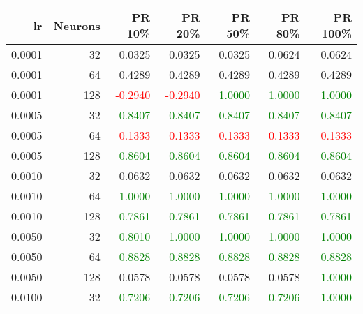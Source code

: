 \begin{tabular}{rrrrrrr}
\toprule
lr & Neurons & PR 10\% & PR 20\% & PR 50\% & PR 80\% & PR 100\% \\
\midrule
0.0001 & 32 & \textcolor{blu} {0.0325} & \textcolor{blu} {0.0325} & \textcolor{blu} {0.0325} & \textcolor{blu} {0.0624} & \textcolor{blu} {0.0624} \\
0.0001 & 64 & \textcolor{blu} {0.4289} & \textcolor{blu} {0.4289} & \textcolor{blu} {0.4289} & \textcolor{blu} {0.4289} & \textcolor{blu} {0.4289} \\
0.0001 & 128 & \textcolor{red} {-0.2940} & \textcolor{red} {-0.2940} & \textcolor{green} {1.0000} & \textcolor{green} {1.0000} & \textcolor{green} {1.0000} \\
0.0005 & 32 & \textcolor{green} {0.8407} & \textcolor{green} {0.8407} & \textcolor{green} {0.8407} & \textcolor{green} {0.8407} & \textcolor{green} {0.8407} \\
0.0005 & 64 & \textcolor{red} {-0.1333} & \textcolor{red} {-0.1333} & \textcolor{red} {-0.1333} & \textcolor{red} {-0.1333} & \textcolor{red} {-0.1333} \\
0.0005 & 128 & \textcolor{green} {0.8604} & \textcolor{green} {0.8604} & \textcolor{green} {0.8604} & \textcolor{green} {0.8604} & \textcolor{green} {0.8604} \\
0.0010 & 32 & \textcolor{blu} {0.0632} & \textcolor{blu} {0.0632} & \textcolor{blu} {0.0632} & \textcolor{blu} {0.0632} & \textcolor{blu} {0.0632} \\
0.0010 & 64 & \textcolor{green} {1.0000} & \textcolor{green} {1.0000} & \textcolor{green} {1.0000} & \textcolor{green} {1.0000} & \textcolor{green} {1.0000} \\
0.0010 & 128 & \textcolor{green} {0.7861} & \textcolor{green} {0.7861} & \textcolor{green} {0.7861} & \textcolor{green} {0.7861} & \textcolor{green} {0.7861} \\
0.0050 & 32 & \textcolor{green} {0.8010} & \textcolor{green} {1.0000} & \textcolor{green} {1.0000} & \textcolor{green} {1.0000} & \textcolor{green} {1.0000} \\
0.0050 & 64 & \textcolor{green} {0.8828} & \textcolor{green} {0.8828} & \textcolor{green} {0.8828} & \textcolor{green} {0.8828} & \textcolor{green} {0.8828} \\
0.0050 & 128 & \textcolor{blu} {0.0578} & \textcolor{blu} {0.0578} & \textcolor{blu} {0.0578} & \textcolor{blu} {0.0578} & \textcolor{green} {1.0000} \\
0.0100 & 32 & \textcolor{green} {0.7206} & \textcolor{green} {0.7206} & \textcolor{green} {0.7206} & \textcolor{green} {0.7206} & \textcolor{green} {1.0000} \\

\end{tabular}
